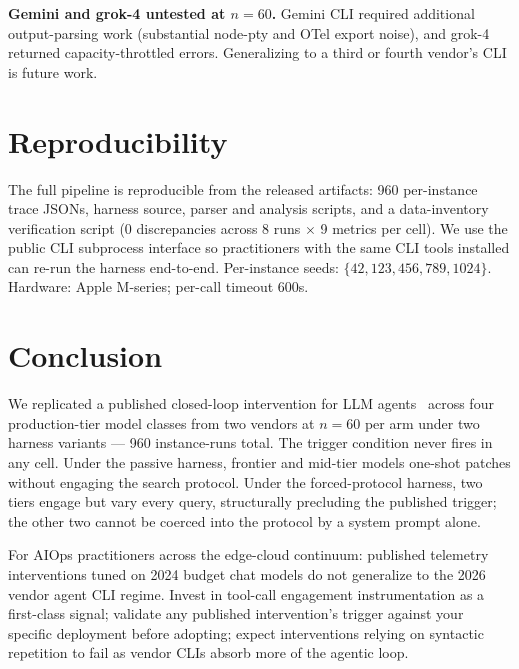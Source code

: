 \documentclass[journal]{IEEEtran}
\begin{document}
\textbf{Gemini and grok-4 untested at $n{=}60$.} Gemini CLI required additional output-parsing work (substantial node-pty and OTel export noise), and grok-4 returned capacity-throttled errors. Generalizing to a third or fourth vendor's CLI is future work.

\section{Reproducibility}

The full pipeline is reproducible from the released artifacts: 960 per-instance trace JSONs, harness source, parser and analysis scripts, and a data-inventory verification script (0 discrepancies across 8 runs $\times$ 9 metrics per cell). We use the public CLI subprocess interface so practitioners with the same CLI tools installed can re-run the harness end-to-end. Per-instance seeds: $\{42, 123, 456, 789, 1024\}$. Hardware: Apple M-series; per-call timeout 600s.

\section{Conclusion}

We replicated a published closed-loop intervention for LLM agents~\cite{aiware2026} across four production-tier model classes from two vendors at $n{=}60$ per arm under two harness variants --- 960 instance-runs total. The trigger condition never fires in any cell. Under the passive harness, frontier and mid-tier models one-shot patches without engaging the search protocol. Under the forced-protocol harness, two tiers engage but vary every query, structurally precluding the published trigger; the other two cannot be coerced into the protocol by a system prompt alone.

For AIOps practitioners across the edge-cloud continuum: published telemetry interventions tuned on 2024 budget chat models do not generalize to the 2026 vendor agent CLI regime. Invest in tool-call engagement instrumentation as a first-class signal; validate any published intervention's trigger against your specific deployment before adopting; expect interventions relying on syntactic repetition to fail as vendor CLIs absorb more of the agentic loop.
\end{document}
